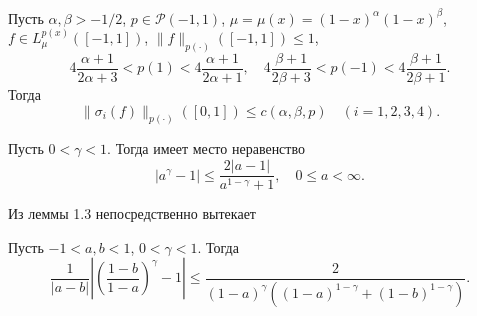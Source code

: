 \begin{lemma}\label{l2}
Пусть $\alpha,\beta>-1/2$, $p\in\mathcal{ P}(-1,1)$, $\mu=\mu(x)=(1-x)^\alpha(1-x)^\beta$, $f\in L_\mu^{p(x)}([-1,1])$, $\|f\|_{p(\cdot)}([-1,1])\le1$,
\begin{equation}\label{8.13}
4\frac{\alpha+1}{2\alpha+3}<p(1)<4\frac{\alpha+1}{2\alpha+1},\quad
4\frac{\beta+1}{2\beta+3}<p(-1)<4\frac{\beta+1}{2\beta+1}.
\end{equation}
Тогда
\begin{equation}\label{8.14}
\|\sigma_i(f)\|_{p(\cdot)}([0,1])\le c(\alpha,\beta,p)\quad (i=1,2,3,4).
\end{equation}
\end{lemma}

\begin{lemma}\label{l3}
Пусть $0<\gamma<1$. Тогда имеет место неравенство
\begin{equation}\label{8.15}
|a^\gamma-1|\le\frac{2|a-1|}{a^{1-\gamma}+1},\quad  0\le a<\infty.
\end{equation}
\end{lemma}
Из леммы 1.3 непосредственно вытекает
\begin{lemma}
Пусть $-1<a,b<1$, $0<\gamma<1$. Тогда
\begin{equation}\label{8.16}
\frac{1}{|a-b|}\left|\left( \frac{1-b}{1-a}\right)^\gamma -1\right|\le \frac{2}{(1-a)^\gamma((1-a)^{1-\gamma}+(1-b)^{1-\gamma})}.
\end{equation}
\end{lemma}



